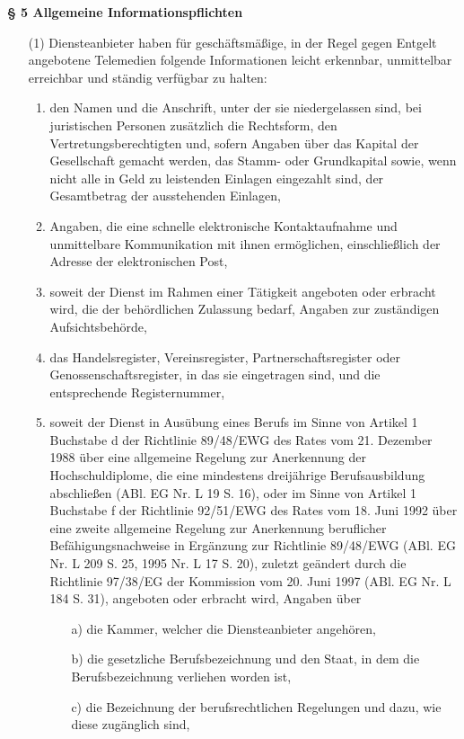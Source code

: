 \documentclass[12pt, twoside, a4paper, ngerman]{article}
\begin{document}
\begin{appendix}
\textbf{§ 5 Allgemeine Informationspflichten}
\begin{itemize}
\item[(1)] Diensteanbieter haben für geschäftsmäßige, in der Regel gegen Entgelt angebotene Telemedien folgende Informationen leicht erkennbar, unmittelbar erreichbar und ständig verfügbar zu halten:
  \begin{enumerate}
    \item den Namen und die Anschrift, unter der sie niedergelassen sind, bei juristischen Personen zusätzlich die Rechtsform, den Vertretungsberechtigten und, sofern Angaben über das Kapital der Gesellschaft gemacht werden, das Stamm- oder Grundkapital sowie, wenn nicht alle in Geld zu leistenden Einlagen eingezahlt sind, der Gesamtbetrag der ausstehenden Einlagen,
    \item Angaben, die eine schnelle elektronische Kontaktaufnahme und unmittelbare Kommunikation mit ihnen ermöglichen, einschließlich der Adresse der elektronischen Post,
    \item soweit der Dienst im Rahmen einer Tätigkeit angeboten oder erbracht wird, die der behördlichen Zulassung bedarf, Angaben zur zuständigen Aufsichtsbehörde,
    \item das Handelsregister, Vereinsregister, Partnerschaftsregister oder Genossenschaftsregister, in das sie eingetragen sind, und die entsprechende Registernummer,
    \item soweit der Dienst in Ausübung eines Berufs im Sinne von Artikel 1 Buchstabe d der Richtlinie 89/48/EWG des Rates vom 21. Dezember 1988 über eine allgemeine Regelung zur Anerkennung der Hochschuldiplome, die eine mindestens dreijährige Berufsausbildung abschließen (ABl. EG Nr. L 19 S. 16), oder im Sinne von Artikel 1 Buchstabe f der Richtlinie 92/51/EWG des Rates vom 18. Juni 1992 über eine zweite allgemeine Regelung zur Anerkennung beruflicher Befähigungsnachweise in Ergänzung zur Richtlinie 89/48/EWG (ABl. EG Nr. L 209 S. 25, 1995 Nr. L 17 S. 20), zuletzt geändert durch die Richtlinie 97/38/EG der Kommission vom 20. Juni 1997 (ABl. EG Nr. L 184 S. 31), angeboten oder erbracht wird, Angaben über
    \begin{itemize}
      \item[a)] die Kammer, welcher die Diensteanbieter angehören,
      \item[b)] die gesetzliche Berufsbezeichnung und den Staat, in dem die Berufsbezeichnung verliehen worden ist,
      \item[c)] die Bezeichnung der berufsrechtlichen Regelungen und dazu, wie diese zugänglich sind,

\end{itemize}
\end{enumerate}
\end{itemize}
\end{appendix}
\end{document}
